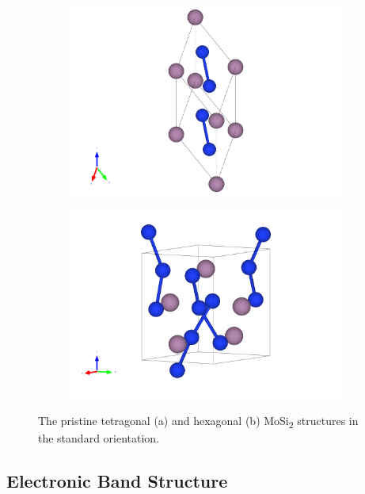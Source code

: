 \documentclass[7.5pt]{article}
\theoremstyle{plain}
\theoremstyle{definition}
\newcommand{\<}{\langle}
\renewcommand{\>}{\rangle}
\begin{document}
\begin{figure}
\centering
\begin{subfigure}{0.4\textwidth}
  \centering
  \includegraphics[width=\linewidth]{MoSi2-tetragonal-std}
  \caption{}
\label{fig:mosi2-tetra}
\end{subfigure}%
\begin{subfigure}{.4\textwidth}
  \centering
  \includegraphics[width=0.75\linewidth]{MoSi2-hexagonal-std}
  \caption{}
\label{fig:mosi2-hexa}
\end{subfigure}
\caption{The pristine tetragonal (a) and hexagonal (b) MoSi\textsubscript{2} structures in the standard orientation.}
\label{fig:MoSi2}
\end{figure}

\clearpage
\subsection{Electronic Band Structure}
\end{document}
